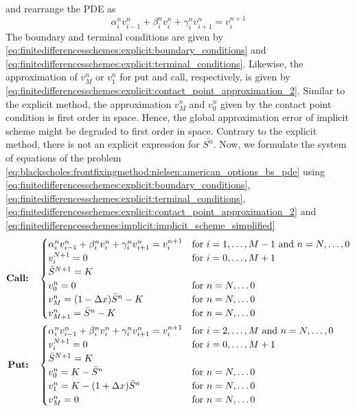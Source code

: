 and rearrange the PDE as
\begin{equation}
  \label{eq:finitedifferencesschemes:implicit:implicit_scheme_simplified}
  \alpha^{n}_{i}v^{n}_{i-1} + \beta^{n}_{i}v^{n}_{i} + \gamma^{n}_{i}v^{n}_{i+1} = v^{n+1}_{i}
\end{equation}
The boundary and terminal conditions are given by \eqref{eq:finitedifferencesschemes:explicit:boundary_conditions} and \eqref{eq:finitedifferencesschemes:explicit:terminal_conditions}. Likewise, the approximation of $v^{n}_{M}$ or $v^{n}_{1}$ for put and call, respectively, is given by \eqref{eq:finitedifferencesschemes:explicit:contact_point_approximation_2}. Similar to the explicit method, the approximation $v^{n}_{M}$ and $v^{n}_{0}$ given by the contact point condition is first order in space. Hence, the global approximation error of implicit scheme might be degraded to first order in space. Contrary to the explicit method, there is not an explicit expression for $\bar{S^n}$. Now, we formulate the system of equations of the problem \eqref{eq:blackscholes:frontfixingmethod:nielsen:american_options_bs_pde}
using \eqref{eq:finitedifferencesschemes:explicit:boundary_conditions}, \eqref{eq:finitedifferencesschemes:explicit:terminal_conditions}, \eqref{eq:finitedifferencesschemes:explicit:contact_point_approximation_2} and \eqref{eq:finitedifferencesschemes:implicit:implicit_scheme_simplified}
{
  \allowdisplaybreaks
  \begin{subequations}
  \label{eq:finitedifferencesschemes:implicit:nielsen_system_of_equation}
  \begin{align}
    \text{\textbf{Call:}} \quad& \begin{cases}
      \alpha^{n}_{i}v^{n}_{i-1} + \beta^{n}_{i}v^{n}_{i} + \gamma^{n}_{i}v^{n}_{i+1} = v^{n+1}_{i} & \text{for $i = 1, \dots, M-1$ and $n = N,\dots,0$} \\
      v^{N+1}_i = 0 & \text{for $i = 0, \dots, M+1$}\\
      \bar{S}^{N+1} = K \\
      v^{n}_0 = 0 & \text{for $n = N, \dots 0$}\\
      v^{n}_{M} = (1-\Delta{x})\bar{S}^n - K & \text{for $n = N, \dots 0$}\\
      v^{n}_{M+1} = \bar{S}^n - K  & \text{for $n = N, \dots 0$}
    \end{cases}\\
    \text{\textbf{Put:}} \quad& \begin{cases}
      \alpha^{n}_{i}v^{n}_{i-1} + \beta^{n}_{i}v^{n}_{i} + \gamma^{n}_{i}v^{n}_{i+1} = v^{n+1}_{i} & \text{for $i = 2, \dots, M$ and $n = N,\dots,0$} \\
      v^{N+1}_i = 0 & \text{for $i = 0, \dots, M+1$} \\
      \bar{S}^{N+1} = K \\
      v^{n}_{0} = K - \bar{S}^{n} & \text{for $n = N, \dots 0$}\\
      v^{n}_{1} =  K - (1+\Delta{x})\bar{S}^{n} & \text{for $n = N, \dots 0$}\\
      v^{n}_{M} = 0 & \text{for $n = N, \dots 0$}
    \end{cases}
  \end{align}
\end{subequations}
}
